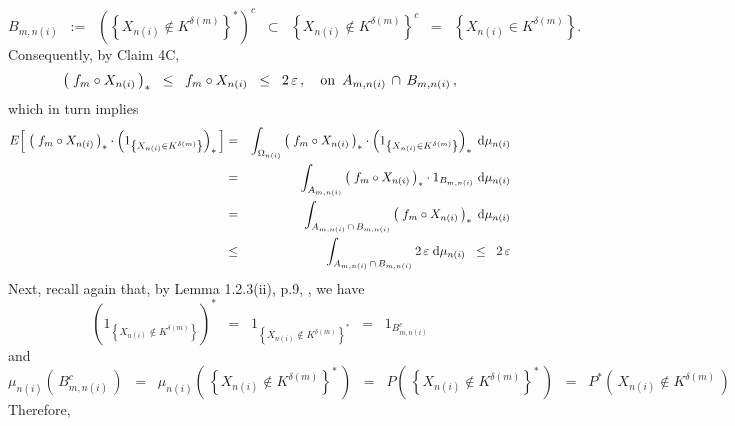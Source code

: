 \begin{equation*}
B_{m,n(i)}
\;\; :=	 \;\;
	\left(\left\{X_{n(i)} \notin K^{\delta(m)}\right\}^{*}\right)^{c}
\;\; \subset \;\;
	\left\{X_{n(i)} \notin K^{\delta(m)}\right\}^{c}
\;\; = \;\;
	\left\{X_{n(i)} \in K^{\delta(m)}\right\}.
\end{equation*}
Consequently, by Claim 4C,
\begin{equation*}
\left(\;f_{m} \circ X_{n(i)}\,\right)_{*}
\;\; \leq \;\;
	f_{m} \circ X_{n(i)}
\;\; \leq \;\;
	2\,\varepsilon\,,
\quad
\textnormal{on \,$A_{m,n(i)} \,\cap\, B_{m,n(i)}$}\,,
\end{equation*}
which in turn implies
\begin{eqnarray*}
E\!\left[\;
	\left(\;f_{m} \circ X_{n(i)}\,\right)_{*}
	\cdot
	\left(1_{\left\{X_{n(i)} \in K^{\delta(m)}\right\}}\right)_{*}
\,\right]
&=&
	\int_{\Omega_{n(i)}}
		\left(\;f_{m} \circ X_{n(i)}\,\right)_{*}
		\cdot
		\left(1_{\left\{X_{n(i)} \in K^{\delta(m)}\right\}}\right)_{*}
	\;\textnormal{d}\mu_{n(i)}
\\
&=&
	\int_{A_{m,n(i)}}
		\left(\;f_{m} \circ X_{n(i)}\,\right)_{*}
		\cdot
		1_{B_{m,n(i)}}
	\;\textnormal{d}\mu_{n(i)}
\\
&=&
	\int_{A_{m,n(i)} \,\cap\, B_{m,n(i)}}
		\left(\;f_{m} \circ X_{n(i)}\,\right)_{*}
	\;\textnormal{d}\mu_{n(i)}
\\
&\leq&
	\int_{A_{m,n(i)} \,\cap\, B_{m,n(i)}} 2\,\varepsilon \;\textnormal{d}\mu_{n(i)}
\;\; \leq \;\;
	2\,\varepsilon
\end{eqnarray*}
Next, recall again that, by Lemma 1.2.3(ii), p.9, \cite{vanDerVaart1996}, we have
\begin{equation*}
\left(1_{\left\{X_{n(i)} \notin K^{\delta(m)}\right\}}\right)^{*}
\;\; = \;\;
	1_{\left\{X_{n(i)} \notin K^{\delta(m)}\right\}^{*}}
\;\; = \;\;
	1_{B_{m,n(i)}^{c}}
\end{equation*}
and
\begin{equation*}
\mu_{n(i)}\!\left(\,B_{m,n(i)}^{c}\,\right)
\;\; = \;\;
	\mu_{n(i)}\!\left(\,\left\{X_{n(i)} \notin K^{\delta(m)}\right\}^{*}\,\right)
\;\; = \;\;
	P\!\left(\,\left\{X_{n(i)} \notin K^{\delta(m)}\right\}^{*}\,\right)
\;\; = \;\;
	P^{*}\!\left(\,X_{n(i)} \notin K^{\delta(m)}\,\right)
\end{equation*}
Therefore,

